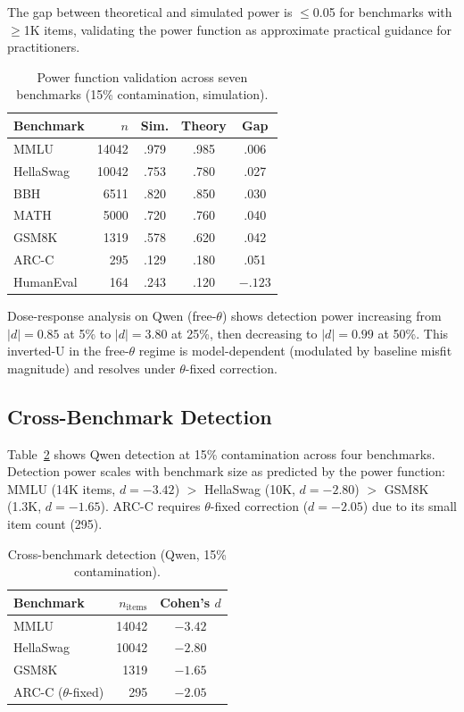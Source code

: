 \documentclass[11pt,a4paper]{article}
\newcommand{\thetafixed}{$\theta$-fixed}
\begin{document}
The gap between theoretical and simulated power is $\leq$0.05 for benchmarks with $\geq$1K items, validating the power function as approximate practical guidance for practitioners.

\begin{table}[t]
\centering
\caption{Power function validation across seven benchmarks (15\% contamination, simulation).}
\label{tab:power}
\small
\begin{tabular}{lrccc}
\toprule
Benchmark & $n$ & Sim. & Theory & Gap \\
\midrule
MMLU & 14042 & .979 & .985 & .006 \\
HellaSwag & 10042 & .753 & .780 & .027 \\
BBH & 6511 & .820 & .850 & .030 \\
MATH & 5000 & .720 & .760 & .040 \\
GSM8K & 1319 & .578 & .620 & .042 \\
ARC-C & 295 & .129 & .180 & .051 \\
HumanEval & 164 & .243 & .120 & $-.123$ \\
\bottomrule
\end{tabular}
\end{table}

Dose-response analysis on Qwen (free-$\theta$) shows detection power increasing from $|d|=0.85$ at 5\% to $|d|=3.80$ at 25\%, then decreasing to $|d|=0.99$ at 50\%. This inverted-U in the free-$\theta$ regime is model-dependent (modulated by baseline misfit magnitude) and resolves under \thetafixed{} correction.

\subsection{Cross-Benchmark Detection}

Table~\ref{tab:crossbench} shows Qwen detection at 15\% contamination across four benchmarks. Detection power scales with benchmark size as predicted by the power function: MMLU (14K items, $d=-3.42$) $>$ HellaSwag (10K, $d=-2.80$) $>$ GSM8K (1.3K, $d=-1.65$). ARC-C requires \thetafixed{} correction ($d=-2.05$) due to its small item count (295).

\begin{table}[t]
\centering
\caption{Cross-benchmark detection (Qwen, 15\% contamination).}
\label{tab:crossbench}
\small
\begin{tabular}{lrc}
\toprule
Benchmark & $n_{\text{items}}$ & Cohen's $d$ \\
\midrule
MMLU & 14042 & $-3.42$ \\
HellaSwag & 10042 & $-2.80$ \\
GSM8K & 1319 & $-1.65$ \\
ARC-C (\thetafixed{}) & 295 & $-2.05$ \\
\bottomrule
\end{tabular}
\end{table}
\end{document}
